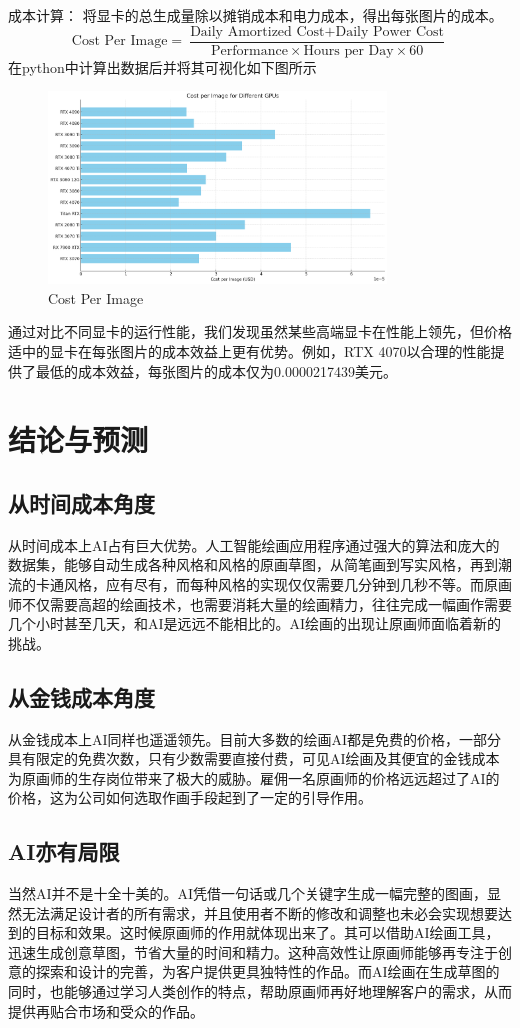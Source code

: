 \documentclass[a4paper,12pt]{ctexart} %
\begin{document}
	成本计算：
	将显卡的总生成量除以摊销成本和电力成本，得出每张图片的成本。
\[
\text{Cost Per Image} = \frac{\text{Daily Amortized Cost} + \text{Daily Power Cost}}{\text{Performance} \times \text{Hours per Day} \times 60}
\]	
在python中计算出数据后并将其可视化如下图所示
\begin{figure}[H]
\centering
\includegraphics[width=0.8\textwidth]{cost_per_image.png}
\caption{Cost Per Image}
\label{fig:example}
\end{figure}

通过对比不同显卡的运行性能，我们发现虽然某些高端显卡在性能上领先，但价格适中的显卡在每张图片的成本效益上更有优势。例如，RTX 4070以合理的性能提供了最低的成本效益，每张图片的成本仅为0.0000217439美元。
	\section{结论与预测} 
	\subsection{从时间成本角度}从时间成本上AI占有巨大优势。人工智能绘画应用程序通过强大的算法和庞大的数据集，能够自动生成各种风格和风格的原画草图，从简笔画到写实风格，再到潮流的卡通风格，应有尽有，而每种风格的实现仅仅需要几分钟到几秒不等。而原画师不仅需要高超的绘画技术，也需要消耗大量的绘画精力，往往完成一幅画作需要几个小时甚至几天，和AI是远远不能相比的。AI绘画的出现让原画师面临着新的挑战。
	\subsection{从金钱成本角度}从金钱成本上AI同样也遥遥领先。目前大多数的绘画AI都是免费的价格，一部分具有限定的免费次数，只有少数需要直接付费，可见AI绘画及其便宜的金钱成本为原画师的生存岗位带来了极大的威胁。雇佣一名原画师的价格远远超过了AI的价格，这为公司如何选取作画手段起到了一定的引导作用。
	\subsection{AI亦有局限}当然AI并不是十全十美的。AI凭借一句话或几个关键字生成一幅完整的图画，显然无法满足设计者的所有需求，并且使用者不断的修改和调整也未必会实现想要达到的目标和效果。这时候原画师的作用就体现出来了。其可以借助AI绘画工具，迅速生成创意草图，节省大量的时间和精力。这种高效性让原画师能够再专注于创意的探索和设计的完善，为客户提供更具独特性的作品。而AI绘画在生成草图的同时，也能够通过学习人类创作的特点，帮助原画师再好地理解客户的需求，从而提供再贴合市场和受众的作品。
\end{document}
